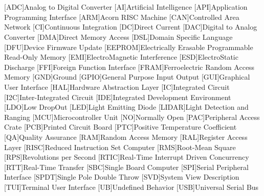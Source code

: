 \cleardoublepage
\chapter*{\listofabbrevname}
{}

\begin{acronym}[KolikMista]

	[ADC]{Analog to Digital Converter}
	[AI]{Artificial Intelligence}
	[API]{Application Programming Interface}
	[ARM]{Acorn RISC Machine}
	[CAN]{Controlled Area Network}
	[CI]{Continuous Integration}
	[DC]{Direct Current}
	[DAC]{Digital to Analog Converter}
	[DMA]{Direct Memory Access}
	[DSL]{Domain Specific Language}
	[DFU]{Device Firmware Update}
	[EEPROM]{Electrically Erasable Programmable Read-Only Memory}
	[EMI]{ElectroMagnetic Interference}
	[ESD]{ElectroStatic Discharge}
	[FFI]{Foreign Function Interface}
	[FRAM]{Ferroelectric Random Access Memory}
	[GND]{Ground}
	[GPIO]{General Purpose Input Output}
	[GUI]{Graphical User Interface}
	[HAL]{Hardware Abstraction Layer}
	[IC]{Integrated Circuit}
	[I2C]{Inter-Integrated Circuit}
	[IDE]{Integrated Development Environment}
	[LDO]{Low DropOut}
	[LED]{Light Emitting Diode}
	[LIDAR]{Light Detection and Ranging}
	[MCU]{Microcontroller Unit}
	[NO]{Normally Open}
	[PAC]{Peripheral Access Crate}
	[PCB]{Printed Circuit Board}
	[PTC]{Positive Temperature Coefficient}
	[QA]{Quality Assurance}
	[RAM]{Random Access Memory}
	[RAL]{Register Access Layer}
	[RISC]{Reduced Instruction Set Computer}
	[RMS]{Root-Mean Square}
	[RPS]{Revolutions per Second}
	[RTIC]{Real-Time Interrupt Driven Concurrency}
	[RTT]{Real-Time Transfer}
	[SBC]{Single Board Computer}
	[SPI]{Serial Peripheral Interface}
	[SPDT]{Single Pole Double Throw}
	[SVD]{System View Description}
	[TUI]{Terminal User Interface}
	[UB]{Undefined Behavior}
	[USB]{Universal Serial Bus}


\end{acronym}
